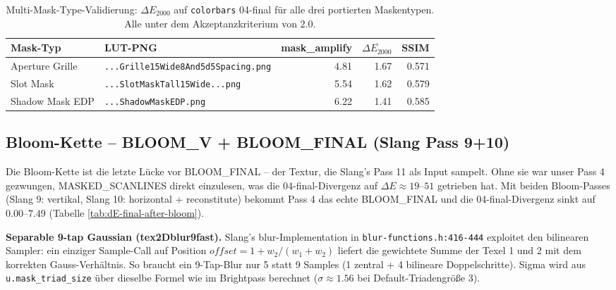 \documentclass[11pt, a4paper]{article}
\newcommand{\tableheadercolor}{\rowcolor{hkared}}
\newcommand{\thw}[1]{\color{white}\textbf{#1}}  %
\begin{document}
\vspace{.25cm}
\begin{table}[H]
\centering
\small
{}
\begin{tabularx}{\textwidth}{llrrr}
    \toprule
    \tableheadercolor \thw{Mask-Typ} & \thw{LUT-PNG} & \thw{mask\_amplify} & \thw{$\overline{\Delta E_{2000}}$} & \thw{SSIM} \\
    \midrule
    Aperture Grille  & \texttt{...Grille15Wide8And5d5Spacing.png}  & 4.81 & 1.67 & 0.571 \\
    Slot Mask        & \texttt{...SlotMaskTall15Wide...png}         & 5.54 & 1.62 & 0.579 \\
    Shadow Mask EDP  & \texttt{...ShadowMaskEDP.png}                & 6.22 & 1.41 & 0.585 \\
    \bottomrule
\end{tabularx}
 \vspace{.25cm}
\caption{Multi-Mask-Type-Validierung: $\Delta E_{2000}$ auf \texttt{colorbars} 04-final f\"ur alle drei portierten Maskentypen. Alle unter dem Akzeptanzkriterium von $2.0$.}
\label{tab:dE-multi-mask}
\end{table}

\vspace{.5cm}
\subsection{Bloom-Kette -- BLOOM\_V + BLOOM\_FINAL (Slang Pass 9+10)}
\vspace{.5cm}
Die Bloom-Kette ist die letzte L\"ucke vor BLOOM\_FINAL -- der Textur, die Slang's Pass 11 als Input sampelt. Ohne sie war unser Pass 4 gezwungen, MASKED\_SCANLINES direkt einzulesen, was die 04-final-Divergenz auf $\Delta E \approx 19$--$51$ getrieben hat. Mit beiden Bloom-Passes (Slang 9: vertikal, Slang 10: horizontal + reconstitute) bekommt Pass 4 das echte BLOOM\_FINAL und die 04-final-Divergenz sinkt auf $0.00$--$7.49$ (Tabelle \ref{tab:dE-final-after-bloom}).

\vspace{.5cm}
\textbf{Separable 9-tap Gaussian (tex2Dblur9fast).} Slang's blur-Implementation in \texttt{blur-functions.h:416-444} exploitet den bilinearen Sampler: ein einziger Sample-Call auf Position $\mathit{offset} = 1 + w_2/(w_1+w_2)$ liefert die gewichtete Summe der Texel 1 und 2 mit dem korrekten Gauss-Verh\"altnis. So braucht ein 9-Tap-Blur nur 5 statt 9 Samples (1 zentral + 4 bilineare Doppelschritte). Sigma wird aus \texttt{u.mask\_triad\_size} \"uber dieselbe Formel wie im Brightpass berechnet ($\sigma \approx 1.56$ bei Default-Triadengr\"o{\ss}e 3).
\end{document}
